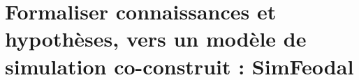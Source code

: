 \setcounter{chapter}{1}
\graphicspath{{chap2/}}

\chapter{Formaliser connaissances et hypothèses, vers un modèle de simulation co-construit : SimFeodal }
\label{chap:chap2}
%
\setcounter{minitocdepth}{1}
\minitoc
\clearpage
{}




